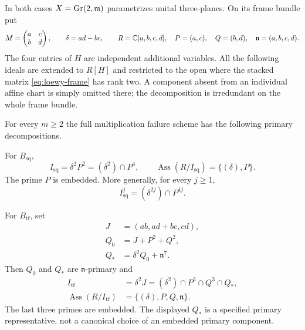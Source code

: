 In both cases $X=\operatorname{Gr}(2,\mathfrak m)$ parametrizes unital
three-planes. On its frame bundle put
\[
 M=\begin{pmatrix}a&c\\b&d\end{pmatrix},\qquad
 \delta=ad-bc,\qquad
 R=\mathbb C[a,b,c,d],\quad P=(a,c),\quad Q=(b,d),\quad
 \mathfrak n=(a,b,c,d).
\]
The four entries of $H$ are independent additional variables.
All the following ideals are extended to $R[H]$ and restricted to
the open where the stacked matrix \eqref{eq:loewy-frame} has rank two.
A component absent from an individual affine chart is simply omitted
there; the decomposition is irredundant on the whole frame bundle.

\begin{theorem}
\label{thm:loewy-primary}
For every $m\ge2$ the full multiplication failure scheme has the
following primary decompositions.

For $B_{\mathrm{sq}}$,
\begin{equation}\label{eq:loewy-square-primary}
 I_{\mathrm{sq}}=\delta^2P^2=(\delta^2)\cap P^4,
 \qquad
 \operatorname{Ass}(R/I_{\mathrm{sq}})=\{(\delta),P\}.
\end{equation}
The prime $P$ is embedded. More generally, for every $j\ge1$,
\begin{equation}\label{eq:loewy-square-powers}
 I_{\mathrm{sq}}^j=(\delta^{2j})\cap P^{4j}.
\end{equation}

For $B_{\mathrm{tf}}$, set
\begin{equation}\label{eq:loewy-mixed-ideals}
 \begin{split}
 J&=(ab,ad+bc,cd),\\
 Q_0&=J+P^2+Q^2,\\
 Q_*&=\delta^2Q_0+\mathfrak n^7.
 \end{split}
\end{equation}
Then $Q_0$ and $Q_*$ are $\mathfrak n$-primary and
\begin{equation}\label{eq:loewy-two-factor-primary}
 \begin{split}
 I_{\mathrm{tf}}&=\delta^2J
       =(\delta^2)\cap P^3\cap Q^3\cap Q_*,\\
 \operatorname{Ass}(R/I_{\mathrm{tf}})
       &=\{(\delta),P,Q,\mathfrak n\}.
 \end{split}
\end{equation}
The last three primes are embedded. The displayed $Q_*$ is a
specified primary representative, not a canonical choice of an
embedded primary component.


\end{theorem}
